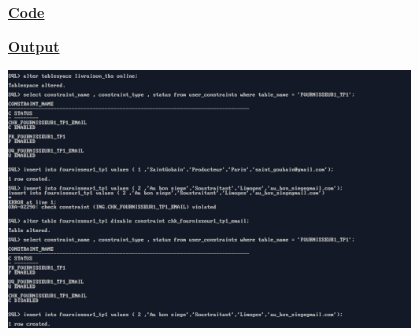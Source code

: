 \newpage
{}

\textbf{\underline{Code}}


\vspace{1cm}
\textbf{\underline{Output}}
\vspace{1cm}
\begin{center}
    \includegraphics[width=0.8\textwidth]{Questions/q46/q46.png}
\end{center}

